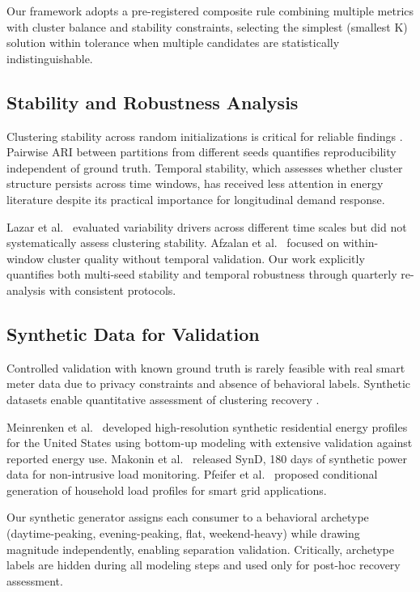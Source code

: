 Our framework adopts a pre-registered composite rule combining multiple metrics with cluster balance and stability constraints, selecting the simplest (smallest K) solution within tolerance when multiple candidates are statistically indistinguishable.

\subsection{Stability and Robustness Analysis}

Clustering stability across random initializations is critical for reliable findings \cite{henning2020adjusting}. Pairwise ARI between partitions from different seeds quantifies reproducibility independent of ground truth. Temporal stability, which assesses whether cluster structure persists across time windows, has received less attention in energy literature despite its practical importance for longitudinal demand response.

Lazar et al.~\cite{lazar2021investigating} evaluated variability drivers across different time scales but did not systematically assess clustering stability. Afzalan et al.~\cite{afzalan2020twostage} focused on within-window cluster quality without temporal validation. Our work explicitly quantifies both multi-seed stability and temporal robustness through quarterly re-analysis with consistent protocols.

\subsection{Synthetic Data for Validation}

Controlled validation with known ground truth is rarely feasible with real smart meter data due to privacy constraints and absence of behavioral labels. Synthetic datasets enable quantitative assessment of clustering recovery \cite{meinrenken2022synthetic,makonin2020synd}.

Meinrenken et al.~\cite{meinrenken2022synthetic} developed high-resolution synthetic residential energy profiles for the United States using bottom-up modeling with extensive validation against reported energy use. Makonin et al.~\cite{makonin2020synd} released SynD, 180 days of synthetic power data for non-intrusive load monitoring. Pfeifer et al.~\cite{pfeifer2024synthetic} proposed conditional generation of household load profiles for smart grid applications.

Our synthetic generator assigns each consumer to a behavioral archetype (daytime-peaking, evening-peaking, flat, weekend-heavy) while drawing magnitude independently, enabling separation validation. Critically, archetype labels are hidden during all modeling steps and used only for post-hoc recovery assessment.

